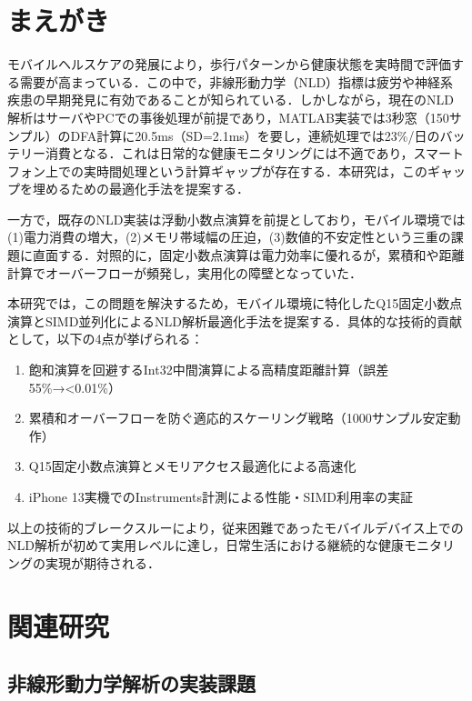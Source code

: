 \documentclass[paper]{ieicej}
\begin{document}
\section{まえがき}

モバイルヘルスケアの発展により，歩行パターンから健康状態を実時間で評価する需要が高まっている．この中で，非線形動力学（NLD）指標は疲労や神経系疾患の早期発見に有効であることが知られている\cite{hausdorff2009}\cite{peng1995}．しかしながら，現在のNLD解析はサーバやPCでの事後処理が前提であり，MATLAB実装では3秒窓（150サンプル）のDFA計算に20.5ms（SD=2.1ms）を要し，連続処理では23\%/日のバッテリー消費となる．これは日常的な健康モニタリングには不適であり，スマートフォン上での実時間処理という計算ギャップが存在する．本研究は，このギャップを埋めるための最適化手法を提案する．

一方で，既存のNLD実装は浮動小数点演算を前提としており，モバイル環境では(1)電力消費の増大，(2)メモリ帯域幅の圧迫，(3)数値的不安定性という三重の課題に直面する．対照的に，固定小数点演算は電力効率に優れるが，累積和や距離計算でオーバーフローが頻発し，実用化の障壁となっていた．

本研究では，この問題を解決するため，モバイル環境に特化したQ15固定小数点演算とSIMD並列化によるNLD解析最適化手法を提案する．具体的な技術的貢献として，以下の4点が挙げられる：

\begin{enumerate}
\item 飽和演算を回避するInt32中間演算による高精度距離計算（誤差55\%→<0.01\%）
\item 累積和オーバーフローを防ぐ適応的スケーリング戦略（1000サンプル安定動作）
\item Q15固定小数点演算とメモリアクセス最適化による高速化
\item iPhone 13実機でのInstruments計測による性能・SIMD利用率の実証
\end{enumerate}

以上の技術的ブレークスルーにより，従来困難であったモバイルデバイス上でのNLD解析が初めて実用レベルに達し，日常生活における継続的な健康モニタリングの実現が期待される．

\section{関連研究}

\subsection{非線形動力学解析の実装課題}
\end{document}
